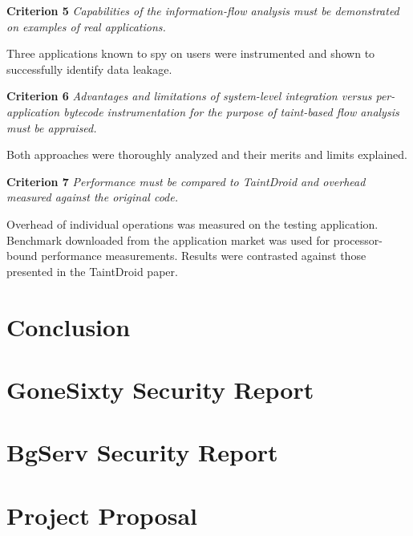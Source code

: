 \documentclass[12pt,twoside,notitlepage]{report}
\begin{document}
\begin{description}
	\item \textbf{Criterion 5} \emph{Capabilities of the information-flow analysis must be demonstrated on examples of real applications.}

	Three applications known to spy on users were instrumented and shown to successfully identify data leakage. 
      
	\item \textbf{Criterion 6} \emph{Advantages and limitations of system-level integration versus per-application bytecode instrumentation for the purpose of taint-based flow analysis must be appraised.}

	Both approaches were thoroughly analyzed and their merits and limits explained.

	\item \textbf{Criterion 7} \emph{Performance must be compared to TaintDroid and overhead measured against the original code.}

	Overhead of individual operations was measured on the testing application. Benchmark downloaded from the application market was used for processor-bound performance measurements. Results were contrasted against those presented in the TaintDroid paper.
\end{description}

\cleardoublepage
\chapter{Conclusion}



\cleardoublepage



\cleardoublepage

\appendix

\chapter{GoneSixty Security Report}
\label{chapter:Report_Gone60}

\cleardoublepage

\chapter{BgServ Security Report}
\label{chapter:Report_BgServ}

\cleardoublepage

\chapter{Project Proposal}


\end{document}
